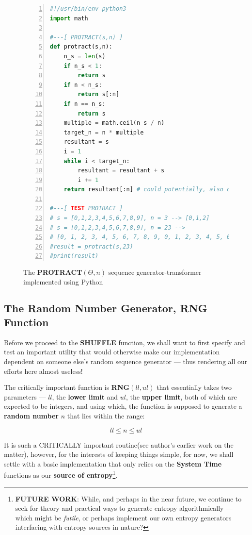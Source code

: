 \documentclass[a4paper, 18pt]{book} %
\begin{document}
\begin{figure}[H]
  \begin{center}
  \begin{lstlisting}[caption={The PROTRACT}, label={LST_PROTRACT}, language=Python, frame=single, numbers=left, basicstyle=\ttfamily,  commentstyle=\color{blue}]
#!/usr/bin/env python3
import math

#---[ PROTRACT(s,n) ]
def protract(s,n):
    n_s = len(s)
    if n_s < 1:
        return s
    if n < n_s:
        return s[:n]
    if n == n_s:
        return s
    multiple = math.ceil(n_s / n)
    target_n = n * multiple
    resultant = s
    i = 1
    while i < target_n:
        resultant = resultant + s
        i += 1
    return resultant[:n] # could potentially, also compress

#---[ TEST PROTRACT ]
# s = [0,1,2,3,4,5,6,7,8,9], n = 3 --> [0,1,2]
# s = [0,1,2,3,4,5,6,7,8,9], n = 23 -->
# [0, 1, 2, 3, 4, 5, 6, 7, 8, 9, 0, 1, 2, 3, 4, 5, 6, 7, 8, 9, 0, 1, 2]
#result = protract(s,23)
#print(result)
\end{lstlisting}
  \end{center}
  \caption{The \textbf{PROTRACT}$(\Theta, n)$ sequence generator-transformer implemented using Python}
\end{figure}


\subsection{The Random Number Generator, RNG Function}

Before we proceed to the \textbf{SHUFFLE} function, we shall want to first specify and test an important utility that would otherwise make our implementation dependent on someone else's random sequence generator --- thus rendering all our efforts here almost useless!

The critically important function is \textbf{RNG}$(ll,ul)$ that essentially takes two parameters --- $ll$, the \textbf{lower limit} and $ul$, the \textbf{upper limit}, both of which are expected to be integers, and using which, the function is supposed to generate a \textbf{random number} $n$ that lies within the range:

\begin{equation}
ll \leq n \leq ul
\end{equation}

It is such a CRITICALLY important routine(see author's earlier work on the matter\cite{lnspaper}), however, for the interests of keeping things simple, for now, we shall settle with a basic implementation that only relies on the \textbf{System Time} functions as our \textbf{source of entropy}\footnote{\textbf{FUTURE WORK}: While, and perhaps in the near future, we continue to seek for theory and practical ways to generate entropy algorithmically --- which might be \textit{futile}, or perhaps implement our own entropy generators interfacing with entropy sources in nature?}.
\end{document}
